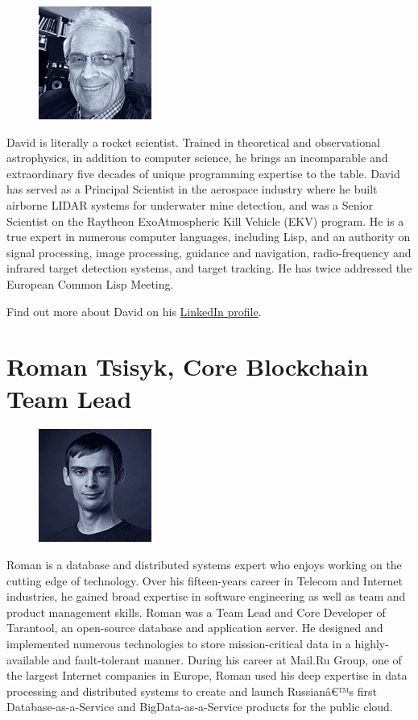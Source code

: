 \documentclass[8pt,fleqn,openany]{book}
\begin{document}
	{
		\setlength\intextsep{0pt}
		\begin{figure}
			\includegraphics{images/team/team-3.png}
		\end{figure}
		
		David is literally a rocket scientist. Trained in theoretical and observational astrophysics, in addition to computer science, he brings an incomparable and extraordinary five decades of unique programming expertise to the table. David has served as a Principal Scientist in the aerospace industry where he built airborne LIDAR systems for underwater mine detection, and was a Senior Scientist on the Raytheon ExoAtmospheric Kill Vehicle (EKV) program. He is a true expert in numerous computer languages, including Lisp, and an authority on signal processing, image processing, guidance and navigation, radio-frequency and infrared target detection systems, and target tracking. He has twice addressed the European Common Lisp Meeting. 
		
		Find out more about David on his \href{https://www.linkedin.com/in/david-mcclain-685669155/}{LinkedIn profile}.
		
		\section{Roman Tsisyk, Core Blockchain Team Lead}
		
		{
			\setlength\intextsep{0pt}
			\begin{figure}
				\includegraphics{images/team/team-4.png}
			\end{figure}
			
			Roman is a database and distributed systems expert who enjoys working on the cutting edge of technology. Over his fifteen-years career in Telecom and Internet industries, he gained broad expertise in software engineering as well as team and product management skills. Roman was a Team Lead and Core Developer of Tarantool, an open-source database and application server. He designed and implemented numerous technologies to store mission-critical data in a highly-available and fault-tolerant manner. During his career at Mail.Ru Group, one of the largest Internet companies in Europe, Roman used his deep expertise in data processing and distributed systems to create and launch Russianâ€™s first Database-as-a-Service and BigData-as-a-Service products for the public cloud. 
			
}}
\end{document}
